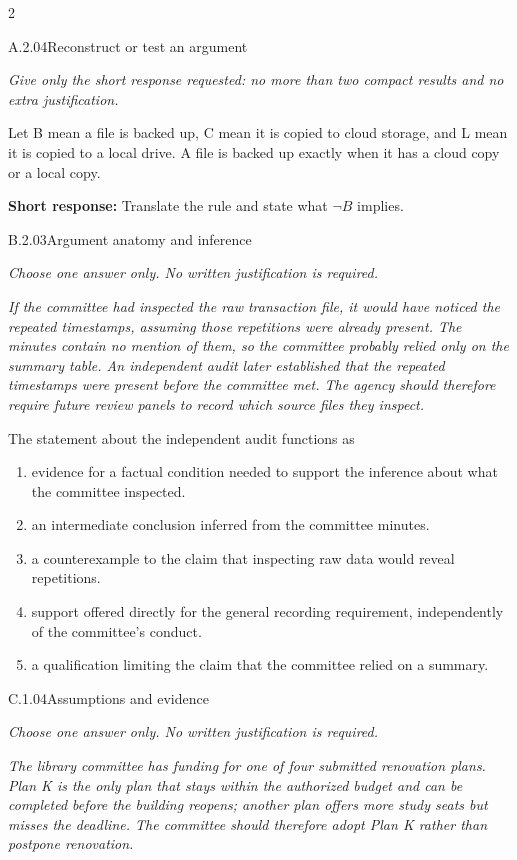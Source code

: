 \documentclass[9pt]{extarticle}
\newcommand{\choice}[1]{\item #1}
\begin{document}
\FormBreak
{}
\begin{multicols}{2}
\begin{DenseCoreProblem}{A.2.04}{Reconstruct or test an argument}
{\scriptsize\textit{Give only the short response requested: no more than two compact results and no extra justification.}\par}
Let B mean a file is backed up, C mean it is copied to cloud storage, and L mean it is copied to a local drive. A file is backed up exactly when it has a cloud copy or a local copy.

\textbf{Short response:} Translate the rule and state what $\neg B$ implies.
\end{DenseCoreProblem}
\begin{DenseCoreProblem}{B.2.03}{Argument anatomy and inference}
{\scriptsize\textit{Choose one answer only. No written justification is required.}\par}
\emph{If the committee had inspected the raw transaction file, it would have noticed the repeated timestamps, assuming those repetitions were already present. The minutes contain no mention of them, so the committee probably relied only on the summary table. An independent audit later established that the repeated timestamps were present before the committee met. The agency should therefore require future review panels to record which source files they inspect.}

The statement about the independent audit functions as
\begin{enumerate}[label=(\alph*)]
  \choice{evidence for a factual condition needed to support the inference about what the committee inspected.}
  \choice{an intermediate conclusion inferred from the committee minutes.}
  \choice{a counterexample to the claim that inspecting raw data would reveal repetitions.}
  \choice{support offered directly for the general recording requirement, independently of the committee's conduct.}
  \choice{a qualification limiting the claim that the committee relied on a summary.}
\end{enumerate}
\end{DenseCoreProblem}
\columnbreak
\begin{DenseCoreProblem}{C.1.04}{Assumptions and evidence}
{\scriptsize\textit{Choose one answer only. No written justification is required.}\par}
\emph{The library committee has funding for one of four submitted renovation plans. Plan K is the only plan that stays within the authorized budget and can be completed before the building reopens; another plan offers more study seats but misses the deadline. The committee should therefore adopt Plan K rather than postpone renovation.}


\end{DenseCoreProblem}
\end{multicols}
\end{document}
